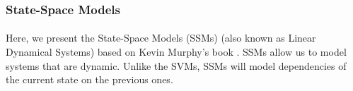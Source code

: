 \subsubsection*{State-Space Models}

\paragraph{}
	Here, we present the State-Space Models (SSMs) (also known as Linear Dynamical Systems) based on Kevin Murphy's book \cite[Chapter 18]{mlBook}. SSMs allow us to model systems that are dynamic. Unlike the SVMs, SSMs will model dependencies of the current state on the previous ones.